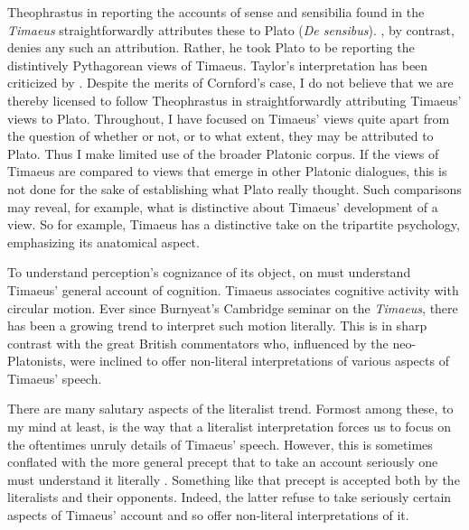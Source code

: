 Theophrastus in reporting the accounts of sense and sensibilia found in the \emph{Timaeus} straightforwardly attributes these to Plato (\emph{De sensibus}). \citet{Taylor:1928qb}, by contrast, denies any such an attribution. Rather, he took Plato to be reporting the distintively Pythagorean views of Timaeus. Taylor's interpretation has been criticized by \citet{Cornford:1935fk}. Despite the merits of Cornford's case, I do not believe that we are thereby licensed to follow Theophrastus in straightforwardly attributing Timaeus' views to Plato. Throughout, I have focused on Timaeus' views quite apart from the question of whether or not, or to what extent, they may be attributed to Plato. Thus I make limited use of the broader Platonic corpus. If the views of Timaeus are compared to views that emerge in other Platonic dialogues, this is not done for the sake of establishing what Plato really thought. Such comparisons may reveal, for example, what is distinctive about Timaeus' development of a view. So for example, Timaeus has a distinctive take on the tripartite psychology, emphasizing its anatomical aspect.

To understand perception's cognizance of its object, on must understand Timaeus' general account of cognition. Timaeus associates cognitive activity with circular motion. Ever since Burnyeat's Cambridge seminar on the \emph{Timaeus}, there has been a growing trend to interpret such motion literally. This is in sharp contrast with the great British commentators who, influenced by the neo-Platonists, were inclined to offer non-literal interpretations of various aspects of Timaeus' speech. 

There are many salutary aspects of the literalist trend. Formost among these, to my mind at least, is the way that a literalist interpretation forces us to focus on the oftentimes unruly details of Timaeus' speech. However, this is sometimes conflated with the more general precept that to take an account seriously one must understand it literally \citep[see][7]{Broadie:2012vl}. Something like that precept is accepted both by the literalists and their opponents. Indeed, the latter refuse to take seriously certain aspects of Timaeus' account and so offer non-literal interpretations of it.

